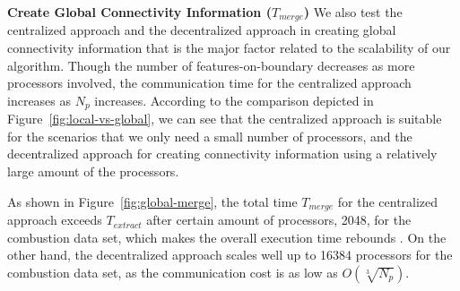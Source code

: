 \textbf{Create Global Connectivity Information ($T_{merge}$)}
%
We also test the centralized approach and the decentralized approach in creating global connectivity information that is the major factor related to the scalability of our algorithm. Though the number of features-on-boundary decreases as more processors involved, the communication time for the centralized approach increases as $N_p$ increases. According to the comparison depicted in Figure~\ref{fig:local-vs-global}, we can see that the centralized approach is suitable for the scenarios that we only need a small number of processors, and the decentralized approach for creating connectivity information using a relatively large amount of the processors.

As shown in Figure~\ref{fig:global-merge}, the total time $T_{merge}$ for the centralized approach exceeds $T_{extract}$ after certain amount of processors, 2048, for the combustion data set, which makes the overall execution time rebounds . On the other hand, the decentralized approach  scales well up to 16384 processors for the combustion data set, as the communication cost is as low as ${O(\sqrt[3]{N_p})}$.